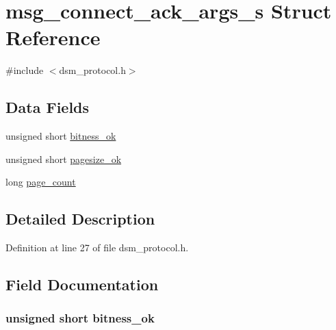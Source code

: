 \hypertarget{structmsg__connect__ack__args__s}{}\section{msg\+\_\+connect\+\_\+ack\+\_\+args\+\_\+s Struct Reference}
\label{structmsg__connect__ack__args__s}


{\ttfamily \#include $<$dsm\+\_\+protocol.\+h$>$}

\subsection*{Data Fields}
\begin{DoxyCompactItemize}
\item 
unsigned short \hyperlink{structmsg__connect__ack__args__s_aa0b109cedb8ce39c95314769d1126799}{bitness\+\_\+ok}
\item 
unsigned short \hyperlink{structmsg__connect__ack__args__s_a166f9ab1c72d1d4c71f2ebf9da6702c0}{pagesize\+\_\+ok}
\item 
long \hyperlink{structmsg__connect__ack__args__s_aa218917fa041e4349e66c0ebf231bd80}{page\+\_\+count}
\end{DoxyCompactItemize}


\subsection{Detailed Description}


Definition at line 27 of file dsm\+\_\+protocol.\+h.



\subsection{Field Documentation}
\subsubsection[{\texorpdfstring{bitness\+\_\+ok}{bitness_ok}}]{\setlength{\rightskip}{0pt plus 5cm}unsigned short bitness\+\_\+ok}\hypertarget{structmsg__connect__ack__args__s_aa0b109cedb8ce39c95314769d1126799}{}\label{structmsg__connect__ack__args__s_aa0b109cedb8ce39c95314769d1126799}


